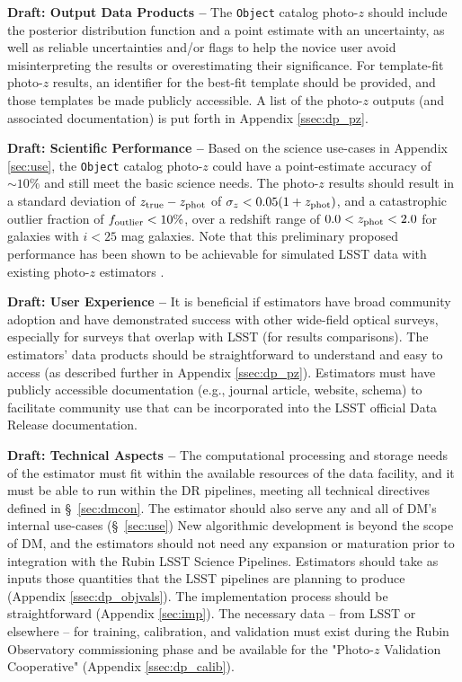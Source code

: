 \documentclass[DM,lsstdraft,toc]{lsstdoc}
\begin{document}
{\bf Draft: Output Data Products --} 
The {\tt Object} catalog photo-$z$ should include the posterior distribution function and a point estimate with an uncertainty, as well as reliable uncertainties and/or flags to help the novice user avoid misinterpreting the results or overestimating their significance.
For template-fit photo-$z$ results, an identifier for the best-fit template should be provided, and those templates be made publicly accessible.
A list of the photo-$z$ outputs (and associated documentation) is put forth in Appendix \ref{ssec:dp_pz}.

{\bf Draft: Scientific Performance --} 
Based on the science use-cases in Appendix \ref{sec:use}, the {\tt Object} catalog photo-$z$ could have a point-estimate accuracy of $\sim10\%$ and still meet the basic science needs.
The photo-$z$ results should result in a standard deviation of $z_{\rm true}-z_{\rm phot}$ of $\sigma_z < 0.05(1+z_{\rm phot})$, and a catastrophic outlier fraction of $f_{\rm outlier} < 10\%$, over a redshift range of $0.0 < z_{\rm phot} < 2.0$ for galaxies with $i<25$ mag galaxies.
Note that this preliminary proposed performance has been shown to be achievable for simulated LSST data with existing photo-$z$ estimators \citep[e.g.,][]{2018AJ....155....1G,2020arXiv200103621S}.

{\bf Draft: User Experience --}
It is beneficial if estimators have broad community adoption and have demonstrated success with other wide-field optical surveys, especially for surveys that overlap with LSST (for results comparisons).
The estimators' data products should be straightforward to understand and easy to access (as described further in Appendix \ref{ssec:dp_pz}).
Estimators must have publicly accessible documentation (e.g., journal article, website, schema) to facilitate community use that can be incorporated into the LSST official Data Release documentation. 

{\bf Draft: Technical Aspects --}
The computational processing and storage needs of the estimator must fit within the available resources of the data facility, and it must be able to run within the DR pipelines, meeting all technical directives defined in \S~\ref{sec:dmcon}. 
The estimator should also serve any and all of DM's internal use-cases (\S~\ref{sec:use})
New algorithmic development is beyond the scope of DM, and the estimators should not need any expansion or maturation prior to integration with the Rubin LSST Science Pipelines.
Estimators should take as inputs those quantities that the LSST pipelines are planning to produce (Appendix \ref{ssec:dp_objvals}).
The implementation process should be straightforward (Appendix \ref{sec:imp}).
The necessary data -- from LSST or elsewhere -- for training, calibration, and validation must exist during the Rubin Observatory commissioning phase and be available for the "Photo-$z$ Validation Cooperative" (Appendix \ref{ssec:dp_calib}).
\end{document}
